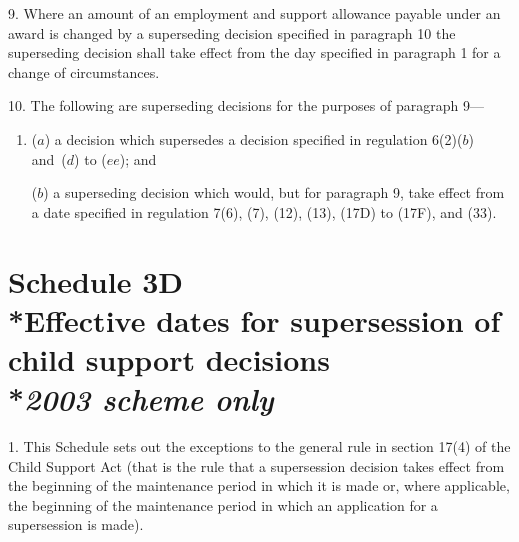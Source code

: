 \documentclass[12pt,a4paper]{article}
\begin{document}
\medskip

9.  Where an amount of an employment and support allowance payable under an award is changed by a superseding decision specified in paragraph 10 the superseding decision shall take effect from the day specified in paragraph 1 for a change of circumstances.

\medskip

10.  The following are superseding decisions for the purposes of paragraph 9—
\begin{enumerate}\item[]
($a$) a decision which supersedes a decision specified in regulation 6(2)($b$)  and~($d$)  to ($ee$); and

\begin{sloppypar}
($b$) a superseding decision which would, but for paragraph 9, take effect from a date specified in regulation 7(6), (7), (12), (13), (17D) to (17F), and (33).
\end{sloppypar}
\end{enumerate}

\part[Schedule 3D --- Effective dates for supersession of child support decisions]{Schedule 3D\\*Effective dates for supersession of child support decisions\\*\emph{2003 scheme only}}

\renewcommand\parthead{--- Schedule 3D}


\medskip

1.  This Schedule sets out the exceptions to the general rule in section 17(4) of the Child Support Act (that is the rule that a supersession decision takes effect from the beginning of the maintenance period in which it is made or, where applicable, the beginning of the maintenance period in which an application for a supersession is made).
\end{document}
